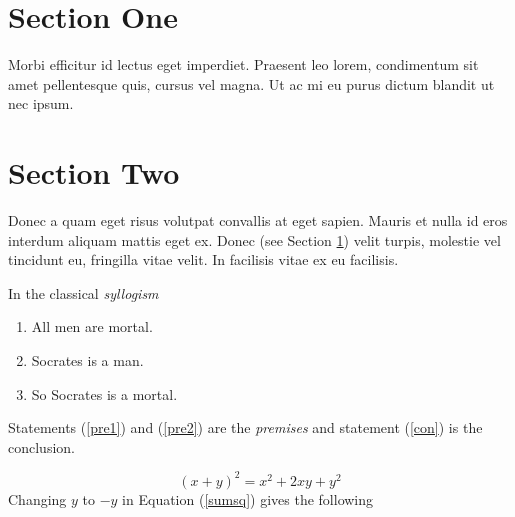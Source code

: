 \documentclass{article}
\begin{document}
\section{Section One}\label{key1}

Morbi efficitur id lectus eget imperdiet. Praesent leo lorem, condimentum sit amet
pellentesque quis, cursus vel magna. Ut ac mi eu purus dictum blandit ut nec ipsum.

\section{Section Two}\label{key2}

Donec a quam eget risus volutpat convallis at eget sapien. Mauris et nulla id eros
interdum aliquam mattis eget ex. Donec (see Section \ref{key1}) velit turpis, molestie vel tincidunt eu,
fringilla vitae velit. In facilisis vitae ex eu facilisis.

In the classical \emph{syllogism}
\begin{enumerate}
\item All men are mortal.\label{pre1}
\item Socrates is a man.\label{pre2}
\item So Socrates is a mortal.\label{con}
\end{enumerate}
Statements (\ref{pre1}) and (\ref{pre2}) are the \emph{premises} and
statement (\ref{con}) is the conclusion.

\begin{equation}\label{sumsq}
(x+y)^2=x^2+2xy+y^2
\end{equation}
Changing $y$ to $-y$ in Equation (\ref{sumsq}) gives the following
\end{document}
